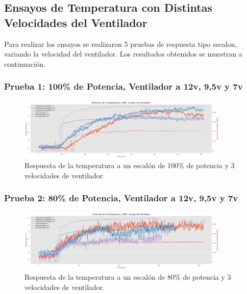 \documentclass[spanish, a4paper, 11pt]{article}
\begin{document}
\FloatBarrier


\subsection{Ensayos de Temperatura con Distintas Velocidades del Ventilador}

Para realizar los ensayos se realizaron 5 pruebas de respuesta tipo escalon, variando la velocidad del ventilador. Los resultados obtenidos se muestran a continuación.

\pagebreak

\subsubsection{Prueba 1: 100\% de Potencia, Ventilador a 12v, 9,5v y 7v}

\begin{figure}[ht]
    \centering
    \includegraphics[width=0.9\textwidth]{./figures/ventilador_100.png}
    \caption{Respuesta de la temperatura a un escalón de 100\% de potencia y 3 velocidades de ventilador.}
\end{figure}
\FloatBarrier

\subsubsection{Prueba 2: 80\% de Potencia, Ventilador a 12v, 9,5v y 7v}

\begin{figure}[ht]
    \centering
    \includegraphics[width=0.9\textwidth]{./figures/ventilador_80.png}
    \caption{Respuesta de la temperatura a un escalón de 80\% de potencia y 3 velocidades de ventilador.}
\end{figure}
\FloatBarrier
\end{document}
